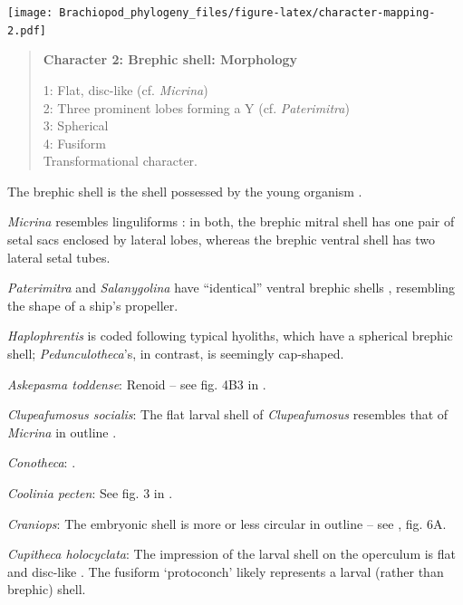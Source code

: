 \documentclass[openany]{book}
\begin{document}
\texttt{[image: Brachiopod\_phylogeny\_files/figure-latex/character-mapping-2.pdf]}

\begin{quote}
\textbf{Character 2: Brephic shell: Morphology}

1: Flat, disc-like (cf. \emph{Micrina})\\
2: Three prominent lobes forming a Y (cf. \emph{Paterimitra})\\
3: Spherical\\
4: Fusiform\\
Transformational character.
\end{quote}

The brephic shell is the shell possessed by the young organism
\citep[see][ and references therein for discussion of
terminology]{Ushatinskaya2016Revisionof}.

\emph{Micrina} resembles linguliforms \citep{Holmer2011Firstrecord}: in
both, the brephic mitral shell has one pair of setal sacs enclosed by
lateral lobes, whereas the brephic ventral shell has two lateral setal
tubes.

\emph{Paterimitra} and \emph{Salanygolina} have ``identical'' ventral
brephic shells \citep{Holmer2011Firstrecord}, resembling the shape of a
ship's propeller.

\emph{Haplophrentis} is coded following typical hyoliths, which have a
spherical brephic shell; \emph{Pedunculotheca}'s, in contrast, is
seemingly cap-shaped.

\hypertarget{Askepasma_toddense-coding-2}{}
\emph{Askepasma toddense}: Renoid -- see fig. 4B3 in
\citet{Topper2013Theoldest}.

\hypertarget{Clupeafumosus_socialis-coding-2}{}
\emph{Clupeafumosus socialis}: The flat larval shell of
\emph{Clupeafumosus} resembles that of \emph{Micrina} in outline
\citetext{\citealp{Topper2013Reappraisalof}; \citealp[cf.][]{Holmer2011Firstrecord}}.

\hypertarget{Conotheca-coding-2}{}
\emph{Conotheca}: \citep{Wrona2003}.

\hypertarget{Coolinia_pecten-coding-2}{}
\emph{Coolinia pecten}: See fig. 3 in
\citet{Bassett2017Earliestontogeny}.

\hypertarget{Craniops-coding-2}{}
\emph{Craniops}: The embryonic shell is more or less circular in outline
-- see \citet{Freeman1999Changesin}, fig. 6A.

\hypertarget{Cupitheca_holocyclata-coding-2}{}
\emph{Cupitheca holocyclata}: The impression of the larval shell on the
operculum is flat and disc-like \citep{Skovsted2016}. The fusiform
`protoconch' \citep{Sun2018} likely represents a larval (rather than
brephic) shell.
\end{document}
